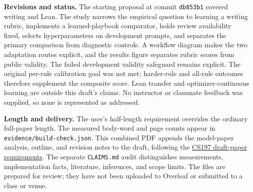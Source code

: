 \documentclass[10pt,letterpaper]{article}
\newcommand{\claim}[2]{#2}
\begin{document}
\textbf{Revisions and status.}
\claim{N10}{The starting proposal at commit \texttt{db853b1} covered writing and Lean.
The study narrows the empirical question to learning a writing rubric, implements a
learned-playbook comparator, holds review availability fixed, selects
hyperparameters on development prompts, and separates the primary comparison
from diagnostic controls. A workflow diagram makes the two adaptation routes
explicit, and the results figure separates rubric scores from public validity.
The failed development validity safeguard remains explicit. The original
per-rule calibration goal was not met; harder-rule and all-rule outcomes
therefore supplement the composite score.
Lean transfer and optimizer-continuous learning are outside this draft's claims.
No instructor or classmate feedback was supplied, so none is represented as addressed.}

\textbf{Length and delivery.}
\claim{N11}{The user's half-length requirement overrides the ordinary full-paper length.
The measured body-word and page counts appear in \texttt{evidence/build-check.json}.
This combined PDF appends the model-paper analysis, outline, and revision notes
to the draft, following the
\href{https://web.stanford.edu/class/cs197/assignments/project.html\#draft-paper}{CS197 draft-paper requirements}.
The separate \texttt{CLAIMS.md} audit distinguishes measurements, implementation
facts, literature, inferences, and scope limits. The files are prepared for review;
they have not been uploaded to Overleaf or submitted to a class or venue.}
\end{document}
